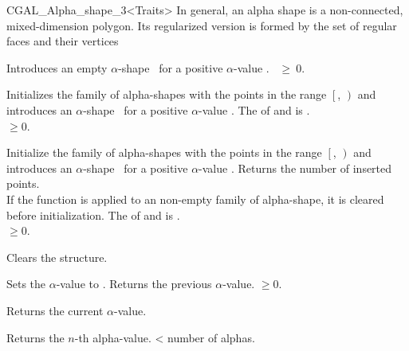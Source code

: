 \begin{ccClassTemplate} {CGAL_Alpha_shape_3<Traits>}
{ In general, an alpha shape is a non-connected, mixed-dimension
polygon. Its regularized version is formed by the set of regular faces
and their vertices}

\ccCreation
{}

{Introduces an empty $\alpha$-shape \ccVar\ for a positive $\alpha$-value
 .
\ccPrecond {}~$\geq~0$.}


{Initializes the family of alpha-shapes with the points in the range
$\left[\right.$, $\left.\right)$ and 
introduces an $\alpha$-shape \ccVar\ for a positive $\alpha$-value
. 
\ccPrecond The  of  and
 is .\\
 $\geq 0$.}

\ccOperations

{Initialize the family of alpha-shapes with the points in the range
$\left[\right.$, $\left.\right)$ and 
introduces an $\alpha$-shape \ccVar\ for a positive $\alpha$-value
. Returns the number of inserted points. \\
If the function is applied to an non-empty family of alpha-shape, it is cleared
before initialization.
\ccPrecond The  of  and
 is .\\
 $\geq 0$.}

{Clears the structure.}

{Sets the $\alpha$-value to .
 Returns the previous $\alpha$-value.
\ccPrecond {} $\geq 0$.}

{Returns the current $\alpha$-value.}

{Returns the $n$-th alpha-value.
 \ccPrecond {} < number of alphas.}


\end{ccClassTemplate}
